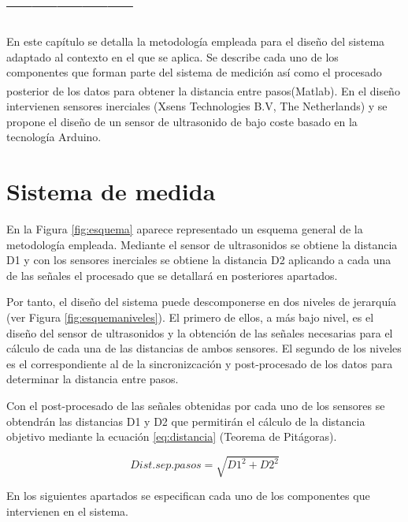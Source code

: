 \section{---------------}















En este capítulo se detalla la metodología empleada para el diseño del sistema adaptado al contexto en el que se aplica. Se describe cada uno de los componentes que forman parte del sistema de medición así como el procesado posterior de los datos para obtener la distancia entre pasos(Matlab\textsuperscript{\textregistered}). En el diseño intervienen sensores inerciales (Xsens Technologies B.V, The Netherlands) y se propone el diseño de un sensor de ultrasonido de bajo coste basado en la tecnología Arduino. 


\section{Sistema de medida}
En la Figura \ref{fig:esquema} aparece representado un esquema general de la metodología empleada. Mediante el sensor de ultrasonidos se obtiene la distancia D1 y con los sensores inerciales se obtiene la distancia D2 aplicando a cada una de las señales el procesado que se detallará en posteriores apartados.


Por tanto, el diseño del sistema puede descomponerse en dos niveles de jerarquía  (ver Figura \ref{fig:esquemaniveles}). El primero de ellos, a más bajo nivel, es el diseño del sensor de ultrasonidos y la obtención de las señales necesarias para el cálculo de cada una de las distancias de ambos sensores. El segundo de los niveles es el correspondiente al de la sincronizcación y post-procesado de los datos para determinar la distancia entre pasos.

 Con el  post-procesado de las señales obtenidas por cada uno de los sensores se obtendrán las distancias D1 y D2 que permitirán el cálculo de la distancia objetivo mediante la ecuación \ref{eq:distancia} (Teorema de Pitágoras).

\begin{equation}\label{eq:distancia}
Dist.sep.pasos = \sqrt{D1^2 + D2^2}
\end{equation}


En los siguientes apartados se especifican cada uno de los componentes que intervienen en el sistema. 

